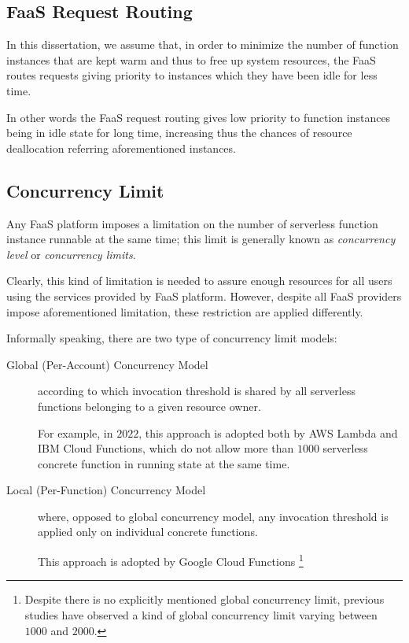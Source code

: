 \documentclass[12pt,a4paper]{report}
\begin{document}
\subsection{FaaS Request Routing}

In this dissertation, we assume that, in order to minimize the number of
function instances that are kept warm and thus to free up system resources, the FaaS routes requests giving priority to instances which they have been idle for less time.

In other words the FaaS request routing gives low priority to function instances being in idle state for long time, increasing thus the chances of resource deallocation referring aforementioned instances.

\subsection{Concurrency Limit}

Any FaaS platform imposes a limitation on the number of serverless function instance runnable at the same time; this limit is generally known as \textit{concurrency level} or \textit{concurrency limits}. 

Clearly, this kind of limitation is needed to assure enough resources for all users using the services provided by FaaS platform. However, despite all FaaS providers impose aforementioned limitation, these restriction are applied differently.

Informally speaking, there are two type of concurrency limit models:

\begin{description}
	\item[Global (Per-Account) Concurrency Model] according to which invocation threshold is shared by all serverless functions belonging to a given resource owner. 
	
	For example, in $2022$, this approach is adopted both by AWS Lambda and IBM Cloud Functions, which do not allow more than $1000$ serverless concrete function in running state at the same time.
	
	\item[Local (Per-Function) Concurrency Model] where, opposed to global concurrency model, any invocation threshold is applied only on individual concrete functions. 
	
	This approach is adopted by Google Cloud Functions \footnote{Despite there is no explicitly mentioned global concurrency limit, previous studies have observed a kind of global concurrency limit varying between $1000$ and $2000$.}
	
\end{description}
\end{document}
